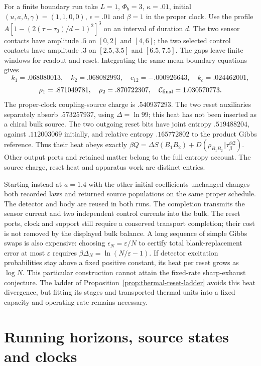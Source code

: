 \documentclass[12pt,a4paper]{article}
\begin{document}
For a finite boundary run take $L=1$, $\Phi_b=3$, $\kappa=.01$,
initial $(u,a,b,\gamma)=(1,1,0,0)$, $\epsilon=.01$ and $\beta=1$ in
the proper clock. Use the profile
$A[1-(2(\tau-\tau_0)/d-1)^2]^3$ on an interval of duration $d$.
The two sensor contacts have amplitude $.5$ on $[0,2]$ and $[4,6]$;
the two selected control contacts have amplitude $.3$ on $[2.5,3.5]$
and $[6.5,7.5]$. The gaps leave finite windows for readout and reset.
Integrating the same mean boundary equations gives
\[
 k_1=.068080013,\quad k_2=.068082993,\quad
 c_{12}=-.000926643,\quad k_c=.024462001,
\]
\[
 \rho_1=.871049781,\quad \rho_2=.870722307,\quad
 \mathcal C_{\rm final}=1.030570773 .
\]
The proper-clock coupling-source charge is $.540937293$.
The two reset auxiliaries separately absorb $.573257937$, using
$\Delta=\ln99$; this heat has not been inserted as a chiral bulk source.
The two outgoing reset bits have joint entropy $.519488204$, against
$.112003069$ initially, and relative entropy $.165772802$ to the product
Gibbs reference. Thus their heat obeys exactly
$\beta Q=\Delta S(B_1B_2)+D(\rho_{B_1B_2}\Vert\tau_\beta^{\otimes2})$.
Other output ports and retained matter belong to the full entropy account.
The source charge, reset heat and apparatus work are distinct entries.

Starting instead at $a=1.4$ with the other initial coefficients unchanged
changes both recorded laws and returned source populations on the same
proper schedule. The detector and body are reused in both runs.
The completion transmits the sensor current and two independent control
currents into the bulk. The reset ports, clock and support still require a
conserved transport completion; their cost is not removed by the displayed
bulk balance. A long sequence of simple Gibbs swaps is also expensive:
choosing $\epsilon_N=\varepsilon/N$ to certify total blank-replacement error
at most $\varepsilon$ requires
$\beta\Delta_N=\ln(N/\varepsilon-1)$.
If detector excitation probabilities stay above a fixed positive constant,
its heat per reset grows as $\log N$. This particular construction cannot
attain the fixed-rate sharp-exhaust conjecture.
The ladder of Proposition~\ref{prop:thermal-reset-ladder} avoids this heat
divergence, but fitting its stages and transported thermal units into a
fixed capacity and operating rate remains necessary.


\section{Running horizons, source states and clocks}
\label{app:running-clocks}
\end{document}
